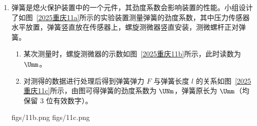 \documentclass[\gkver]{gaokaozhenti}
\begin{document}
\begin{enumerate}
\item
弹簧是熄火保护装置中的一个元件，其劲度系数会影响装置的性能。小组设计了如图~\ref{2025重庆11a}所示的实验装置测量弹簧的劲度系数，其中压力传感器水平放置，弹簧竖直放在传感器上，螺旋测微器竖直安装，测微螺杆正对弹簧。
\begin{enumerate}
	\item
	某次测量时，螺旋测微器的示数如图~\ref{2025重庆11b}所示，此时读数为  $\Umm$。
	\item
	对测得的数据进行处理后得到弹簧弹力 $F$ 与弹簧长度 $l$ 的关系如图~\ref{2025重庆11c}所示，由图可得弹簧的劲度系数为  $\UNm$，弹簧原长为  $\Umm$（均保留 3 位有效数字）。
\end{enumerate}

{figs/11b.png}
{figs/11c.png}



\end{enumerate}
\end{document}
